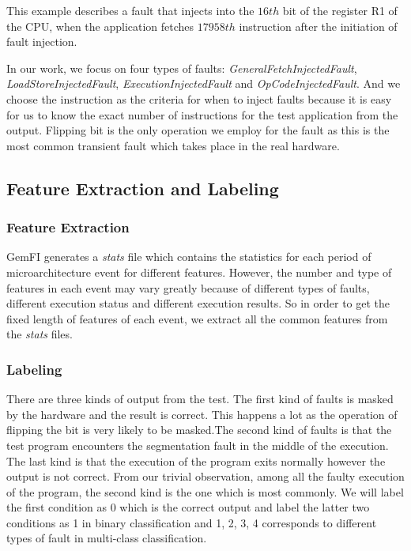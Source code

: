 This example describes a fault that injects into the $16th$ bit of the register R1 of the CPU, when the application fetches $17958th$ instruction after the initiation of fault injection. 

In our work, we focus on four types of faults: \textit{GeneralFetchInjectedFault}, \textit{LoadStoreInjectedFault}, \textit{ExecutionInjectedFault} and \textit{OpCodeInjectedFault}. And we choose the instruction as the criteria for when to inject faults because it is easy for us to know the exact number of instructions for the test application from the output. Flipping bit is the only operation we employ for the fault as this is the most common transient fault which takes place in the real hardware. 



\subsection{Feature Extraction and Labeling}\label{section:FE}
\subsubsection{Feature Extraction}
GemFI generates a \emph{stats} file which contains the statistics for each period of microarchitecture event for different features. However, the number and type of features in each event may vary greatly because of different types of faults, different execution status and different execution results. So in order to get the fixed length of features of each event, we extract all the common features from the \emph{stats} files. 
\subsubsection{Labeling}
There are three kinds of output from the test. The first kind of faults is masked by the hardware and the result is correct. This happens a lot as the operation of flipping the bit is very likely to be masked.The second kind of faults is that the test program encounters the segmentation fault in the middle of the execution. The last kind is that the execution of the program exits normally however the output is not correct. From our trivial observation, among all the faulty execution of the program, the second kind is the one which is most commonly. We will label the first condition as 0 which is the correct output and label the latter two conditions as 1 in binary classification and 1, 2, 3, 4 corresponds to different types of fault in multi-class classification.


